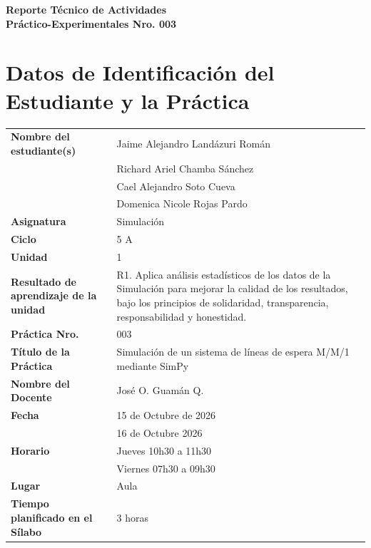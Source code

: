 \documentclass[11pt,a4paper]{article}
\begin{document}
\thispagestyle{fancy}

\vspace*{0.15cm}

\begin{center}
{\bfseries\fontsize{23}{26}\selectfont
Reporte Técnico de Actividades\\
Práctico-Experimentales Nro. 003\par}
\end{center}

\section{Datos de Identificación del Estudiante y la Práctica}

\noindent
\begin{tabularx}{\textwidth}{|L{0.43\textwidth}|Y|}
\hline
\textbf{Nombre del estudiante(s)} & Jaime Alejandro Landázuri Román \\
 & Richard Ariel Chamba Sánchez \\
 & Cael Alejandro Soto Cueva \\
 & Domenica Nicole Rojas Pardo \\ \hline
\textbf{Asignatura} & Simulación \\ \hline
\textbf{Ciclo} & 5 A \\ \hline
\textbf{Unidad} & 1 \\ \hline
\textbf{Resultado de aprendizaje de la unidad} & R1. Aplica análisis estadísticos de los datos
de la Simulación para mejorar la calidad de los resultados, bajo los principios de solidaridad, transparencia, responsabilidad y honestidad. \\ \hline
\textbf{Práctica Nro.} & 003 \\ \hline
\textbf{Título de la Práctica} & Simulación de un sistema de líneas de espera M/M/1 mediante SimPy \\ \hline
\textbf{Nombre del Docente} & José O. Guamán Q. \\ \hline
\textbf{Fecha} & 15 de Octubre de 2026 \\
 & 16 de Octubre 2026 \\ \hline
\textbf{Horario} & Jueves 10h30 a 11h30 \\
 & Viernes 07h30 a 09h30 \\ \hline
\textbf{Lugar} & Aula \\ \hline
\textbf{Tiempo planificado en el Sílabo} & 3 horas \\ \hline
\end{tabularx}
\end{document}
